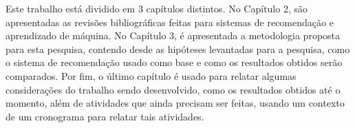 Este trabalho está dividido em 3 capítulos distintos. No Capítulo 2,
são apresentadas as revisões bibliográficas feitas para sistemas de recomendação e aprendizado de máquina.
No Capítulo 3, é apresentada a metodologia proposta para esta pesquisa, contendo desde as hipóteses levantadas para a pesquisa,
 como o sistema de recomendação usado como base e como os resultados obtidos serão comparados. Por fim, o último capítulo é usado para relatar
algumas considerações do trabalho sendo desenvolvido, como os resultados obtidos até o momento, além de atividades que ainda precisam ser feitas,
usando um contexto de um cronograma para relatar tais atividades.
